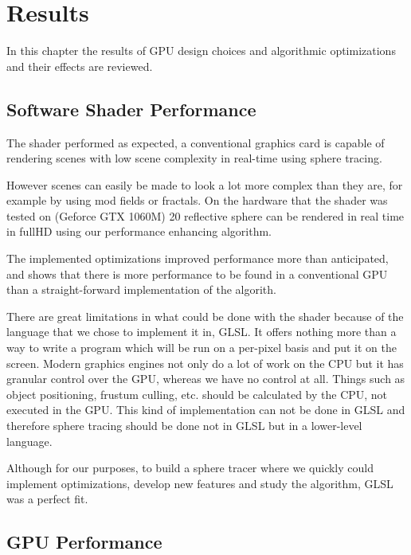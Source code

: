 \chapter{Results}

	In this chapter the results of GPU design choices and algorithmic optimizations
	and their effects are reviewed.

	\section{Software Shader Performance}

		The shader performed as expected, a conventional graphics card is 
		capable of rendering scenes with low scene complexity in real-time
		using sphere tracing.

		However scenes can easily be made to look a lot more complex than they 
		are, for example by using mod fields or fractals. On the hardware that 
		the shader was tested on (Geforce GTX 1060M) 20 reflective sphere can
		be rendered in real time in fullHD using our performance enhancing 
		algorithm.

		The implemented optimizations improved performance more than anticipated,
		and shows that there is more performance to be found in a conventional
		GPU than a straight-forward implementation of the algorith. 

		There are great limitations in what could be done with the shader because
		of the language that we chose to implement it in, GLSL. It offers nothing 
		more than a way to write a program which will be run on a per-pixel basis
		and put it on the screen. Modern graphics engines not only do a lot of work on the
		CPU but it has granular control over the GPU, whereas we have no control
		at all. Things such as object positioning, frustum culling, etc. should be 
		calculated by the CPU, not executed in the GPU. This kind of implementation can 
		not be done in GLSL and therefore sphere tracing should be done not in 
		GLSL but in a lower-level language.

		Although for our purposes, to build a sphere tracer where we quickly could implement
		optimizations, develop new features and study the algorithm, GLSL was a
		perfect fit. 




		


	\section{GPU Performance}

